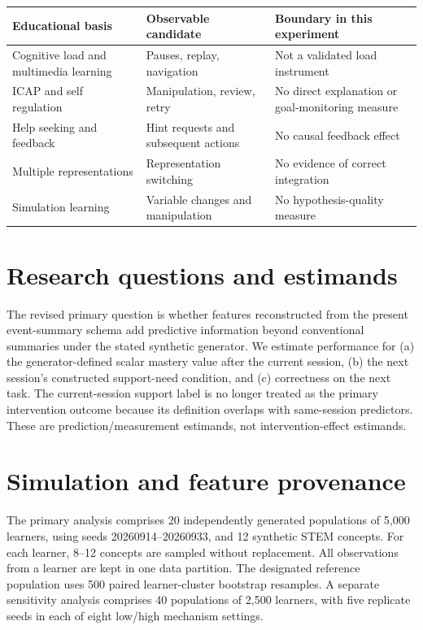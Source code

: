 \documentclass[11pt]{article}
\begin{document}
\begin{center}
\small
\begin{tabularx}{\linewidth}{@{}>{\raggedright\arraybackslash}X>{\raggedright\arraybackslash}X>{\raggedright\arraybackslash}X@{}}
\toprule
\textbf{Educational basis} & \textbf{Observable candidate} & \textbf{Boundary in this experiment} \\
\midrule
Cognitive load and multimedia learning & Pauses, replay, navigation & Not a validated load instrument \\
ICAP and self regulation & Manipulation, review, retry & No direct explanation or goal-monitoring measure \\
Help seeking and feedback & Hint requests and subsequent actions & No causal feedback effect \\
Multiple representations & Representation switching & No evidence of correct integration \\
Simulation learning & Variable changes and manipulation & No hypothesis-quality measure \\
\bottomrule
\end{tabularx}
\end{center}

\section{Research questions and estimands}

The revised primary question is whether features reconstructed from the present event-summary schema add predictive information beyond conventional summaries under the stated synthetic generator. We estimate performance for (a) the generator-defined scalar mastery value after the current session, (b) the next session’s constructed support-need condition, and (c) correctness on the next task. The current-session support label is no longer treated as the primary intervention outcome because its definition overlaps with same-session predictors. These are prediction/measurement estimands, not intervention-effect estimands.

\section{Simulation and feature provenance}

The primary analysis comprises 20 independently generated populations of 5,000 learners, using seeds 20260914–20260933, and 12 synthetic STEM concepts. For each learner, 8–12 concepts are sampled without replacement. All observations from a learner are kept in one data partition. The designated reference population uses 500 paired learner-cluster bootstrap resamples. A separate sensitivity analysis comprises 40 populations of 2,500 learners, with five replicate seeds in each of eight low/high mechanism settings.
\end{document}
